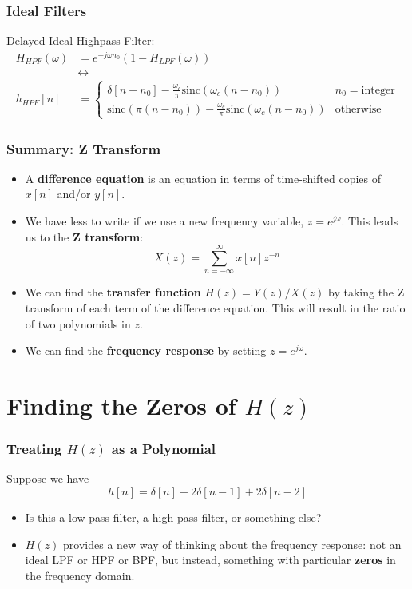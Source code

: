 \documentclass{beamer}
\begin{document}
\begin{frame}
  \frametitle{Ideal Filters}
  Delayed Ideal Highpass Filter:
  \begin{align*}
    H_{HPF}(\omega)&=e^{-j\omega n_0}\left(1-H_{LPF}(\omega)\right)\\
    &\leftrightarrow\\
    h_{HPF}[n]&=\begin{cases}
    \delta[n-n_0]-\frac{\omega_c}{\pi}\mbox{sinc}(\omega_c (n-n_0)) & n_0=\mbox{integer}\\
    \mbox{sinc}(\pi (n-n_0))-\frac{\omega_c}{\pi}\mbox{sinc}(\omega_c (n-n_0)) & \mbox{otherwise}
    \end{cases}
  \end{align*}
\end{frame}

\begin{frame}
  \frametitle{Summary: Z Transform}
  \begin{itemize}
  \item A {\bf difference equation} is an equation in terms of
    time-shifted copies of $x[n]$ and/or $y[n]$.
  \item We have less to write if we use a new frequency variable,
    $z=e^{j\omega}$.  This leads us to the \textbf{Z transform}:
    \[
    X(z) = \sum_{n=-\infty}^\infty x[n]z^{-n}
    \]
  \item We can find the \textbf{transfer function}
    $H(z)=Y(z)/X(z)$ by taking the Z transform of each term of
    the difference equation.  This will result in the ratio of two polynomials in $z$.
  \item We can find the \textbf{frequency response} by
    setting $z=e^{j\omega}$.
  \end{itemize}
\end{frame}


\section[Zeros]{Finding the Zeros of $H(z)$}
\setcounter{subsection}{1}

\begin{frame}
  \frametitle{Treating $H(z)$ as a Polynomial}

  Suppose we have
  \[
  h[n] = \delta[n]-2\delta[n-1] + 2\delta[n-2]
  \]
  \begin{itemize}
  \item Is this a low-pass filter, a high-pass
    filter, or something else?
  \item $H(z)$ provides a new way of thinking about the frequency response:
    not an ideal LPF or HPF or BPF, but instead, something with
    particular {\bf zeros} in the frequency domain.
  \end{itemize}
\end{frame}
\end{document}
